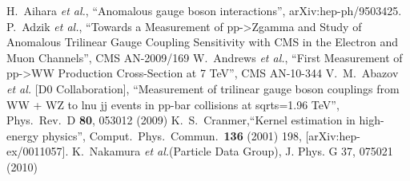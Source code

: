 \begin{thebibliography}{99}                                                                                                                               
  H.~Aihara {\it et al.}, ``Anomalous gauge boson interactions'',
  arXiv:hep-ph/9503425.
  P.~Adzik {\it et al.}, ``Towards a Measurement of pp->Zgamma and Study of Anomalous Trilinear Gauge Coupling Sensitivity with CMS in the Electron and Muon Channels'',
  CMS AN-2009/169
  W.~Andrews {\it et al.}, ``First Measurement of pp->WW Production Cross-Section at 7 TeV'',
  CMS AN-10-344
  V.~M.~Abazov {\it et al.}  [D0 Collaboration], ``Measurement of trilinear gauge boson couplings from WW + WZ to lnu jj events in pp-bar collisions at sqrt{s}=1.96 TeV'',
  Phys.\ Rev.\  D {\bf 80}, 053012 (2009)
  K.~S.~Cranmer,``Kernel estimation in high-energy physics'',  Comput.\ Phys.\ Commun.\  {\bf 136} (2001) 198,  [arXiv:hep-ex/0011057].
  K.~Nakamura {\it et al.}(Particle Data Group), J. Phys. G 37, 075021 (2010)
\end{thebibliography} 
